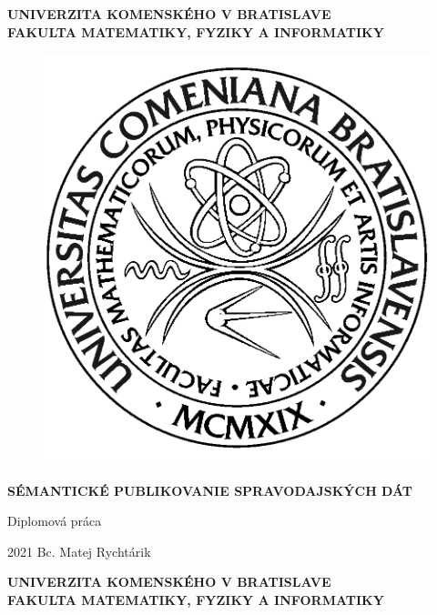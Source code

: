 \documentclass[12pt, a4paper, oneside]{book}
\newcommand\mftitle{Sémantické publikovanie spravodajských dát}
\newcommand\mfthesistype{Diplomová práca}
\newcommand\mfauthor{Bc. Matej Rychtárik}
\newcommand\mfuniversity{UNIVERZITA KOMENSKÉHO V BRATISLAVE}
\newcommand\mffaculty{FAKULTA MATEMATIKY, FYZIKY A INFORMATIKY}
\begin{document}
\frontmatter

\thispagestyle{empty}

\noindent
\begin{minipage}{\textwidth}
\begin{center}
\textbf{\mfuniversity \\
\mffaculty}
\end{center}
\end{minipage}

\vfill
\begin{figure}[!hbt]
	\begin{center}
		\includegraphics{images/logo_fmph}
		\label{img:logo}
	\end{center}
\end{figure}
\begin{center}
	\begin{minipage}{0.8\textwidth}
		\centerline{\textbf{\Large\MakeUppercase{\mftitle}}}
		\smallskip
		\centerline{\mfthesistype}
	\end{minipage}
\end{center}
\vfill
2021 \hfill
\mfauthor
\eject 

\thispagestyle{empty}

\noindent
\begin{minipage}{\textwidth}
\begin{center}
\textbf{\mfuniversity \\
\mffaculty}
\end{center}
\end{minipage}
\end{document}
